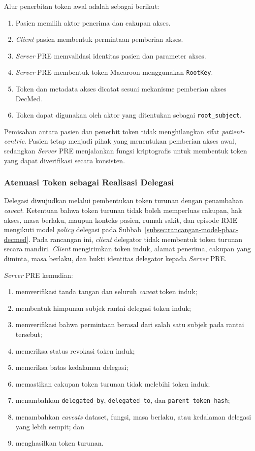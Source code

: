\documentclass[bahasa, 12pt, a4paper, onecolumn, oneside, final]{report}
\begin{document}
Alur penerbitan token awal adalah sebagai berikut:

\begin{enumerate}
	\item Pasien memilih aktor penerima dan cakupan akses.
	\item \textit{Client} pasien membentuk permintaan pemberian akses.
	\item \textit{Server} PRE memvalidasi identitas pasien dan parameter akses.
	\item \textit{Server} PRE membentuk token Macaroon menggunakan \texttt{RootKey}.
	\item Token dan metadata akses dicatat sesuai mekanisme pemberian akses DecMed.
	\item Token dapat digunakan oleh aktor yang ditentukan sebagai \texttt{root\_subject}.
\end{enumerate}

Pemisahan antara pasien dan penerbit token tidak menghilangkan sifat \textit{patient-centric}. Pasien tetap menjadi pihak yang menentukan pemberian akses awal, sedangkan \textit{Server} PRE menjalankan fungsi kriptografis untuk membentuk token yang dapat diverifikasi secara konsisten.

\subsubsection{Atenuasi Token sebagai Realisasi Delegasi}

Delegasi diwujudkan melalui pembentukan token turunan dengan penambahan \textit{caveat}. Ketentuan bahwa token turunan tidak boleh memperluas cakupan, hak akses, masa berlaku, maupun konteks pasien, rumah sakit, dan episode RME mengikuti model \textit{policy} delegasi pada Subbab~\ref{subsec:rancangan-model-pbac-decmed}. Pada rancangan ini, \textit{client} delegator tidak membentuk token turunan secara mandiri. \textit{Client} mengirimkan token induk, alamat penerima, cakupan yang diminta, masa berlaku, dan bukti identitas delegator kepada \textit{Server} PRE.

\textit{Server} PRE kemudian:

\begin{enumerate}
	\item memverifikasi tanda tangan dan seluruh \textit{caveat} token induk;
	\item membentuk himpunan subjek rantai delegasi token induk;
	\item memverifikasi bahwa permintaan berasal dari salah satu subjek pada rantai tersebut;
	\item memeriksa status revokasi token induk;
	\item memeriksa batas kedalaman delegasi;
	\item memastikan cakupan token turunan tidak melebihi token induk;
	\item menambahkan \texttt{delegated\_by}, \texttt{delegated\_to}, dan \texttt{parent\_token\_hash};
	\item menambahkan \textit{caveats} dataset, fungsi, masa berlaku, atau kedalaman delegasi yang lebih sempit; dan
	\item menghasilkan token turunan.
\end{enumerate}
\end{document}

